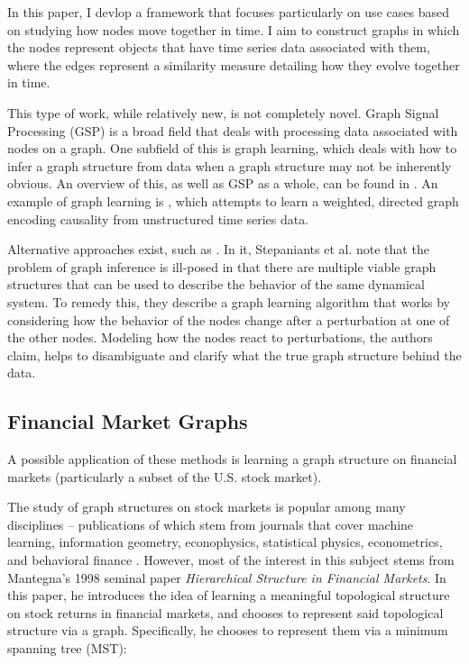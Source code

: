 \documentclass[12pt]{article}
\theoremstyle{definition}
\begin{document}
In this paper, I devlop a framework that focuses particularly on use cases based on studying how nodes move together in time. I  aim to construct graphs in which the nodes represent objects that have time series data associated with them, where the edges represent a similarity measure detailing how they evolve together in time. 

This type of work, while relatively new, is not completely novel. Graph Signal Processing (GSP) is a broad field that deals with processing data associated with nodes on a graph. One subfield of this is graph learning, which deals with how to infer a graph structure from data when a graph structure may not be inherently obvious. An overview of this, as well as GSP as a whole, can be found in \cite{gspOverview}. An example of graph learning is \cite{causalModelingGraph}, which attempts to learn a weighted, directed graph encoding causality from unstructured time series data.

Alternative approaches exist, such as \cite{PhysRevInferringCausalNetworksPerturbations}. In it, Stepaniants et al. note that the problem of graph inference is ill-posed in that there are multiple viable graph structures that can be used to describe the behavior of the same dynamical system. To remedy this, they describe a graph learning algorithm that works by considering how the behavior of the nodes change after a perturbation at one of the other nodes. Modeling how the nodes react to perturbations, the authors claim, helps to disambiguate and clarify what the true graph structure behind the data.

\subsection{Financial Market Graphs}
\label{subsec:financialMarketGraphs}

A possible application of these methods is learning a graph structure on financial markets (particularly a subset of the U.S. stock market). 

The study of graph structures on stock markets is popular among many disciplines -- publications of which stem from journals that cover machine learning, information geometry, econophysics, statistical physics, econometrics, and behavioral finance \cite{networkSurveyFinance}. However, most of the interest in this subject stems from Mantegna's 1998 seminal paper \cite{mantegnaSeminalPaper} \textit{Hierarchical Structure in Financial Markets}. In this paper, he introduces the idea of learning a meaningful topological structure on stock returns in financial markets, and chooses to represent said topological structure via a graph. Specifically, he chooses to represent them via a minimum spanning tree (MST):
\end{document}
